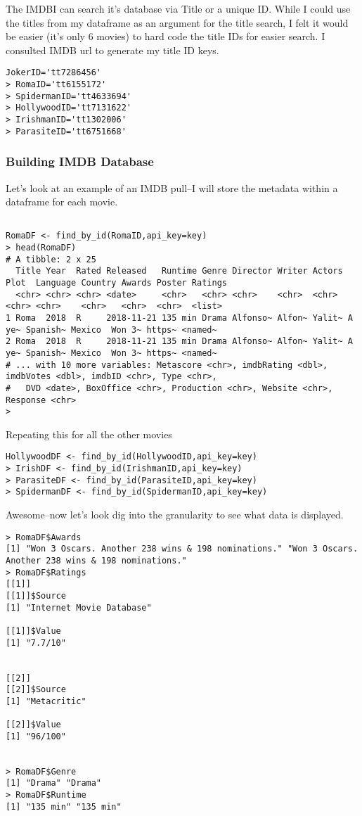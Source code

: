 \documentclass[
]{article}
\begin{document}
The IMDBI can search it's database via Title or a unique ID. While I
could use the titles from my dataframe as an argument for the title
search, I felt it would be easier (it's only 6 movies) to hard code the
title IDs for easier search. I consulted IMDB url to generate my title
ID keys.

\begin{verbatim}
JokerID='tt7286456'
> RomaID='tt6155172'
> SpidermanID='tt4633694'
> HollywoodID='tt7131622'
> IrishmanID='tt1302006'
> ParasiteID='tt6751668'
\end{verbatim}

\hypertarget{building-imdb-database}{%
\subsubsection{Building IMDB Database}\label{building-imdb-database}}

Let's look at an example of an IMDB pull--I will store the metadata
within a dataframe for each movie.

\begin{verbatim}

RomaDF <- find_by_id(RomaID,api_key=key)
> head(RomaDF)
# A tibble: 2 x 25
  Title Year  Rated Released   Runtime Genre Director Writer Actors Plot  Language Country Awards Poster Ratings
  <chr> <chr> <chr> <date>     <chr>   <chr> <chr>    <chr>  <chr>  <chr> <chr>    <chr>   <chr>  <chr>  <list> 
1 Roma  2018  R     2018-11-21 135 min Drama Alfonso~ Alfon~ Yalit~ A ye~ Spanish~ Mexico  Won 3~ https~ <named~
2 Roma  2018  R     2018-11-21 135 min Drama Alfonso~ Alfon~ Yalit~ A ye~ Spanish~ Mexico  Won 3~ https~ <named~
# ... with 10 more variables: Metascore <chr>, imdbRating <dbl>, imdbVotes <dbl>, imdbID <chr>, Type <chr>,
#   DVD <date>, BoxOffice <chr>, Production <chr>, Website <chr>, Response <chr>
> 
\end{verbatim}

Repeating this for all the other movies

\begin{verbatim}
HollywoodDF <- find_by_id(HollywoodID,api_key=key)
> IrishDF <- find_by_id(IrishmanID,api_key=key)
> ParasiteDF <- find_by_id(ParasiteID,api_key=key)
> SpidermanDF <- find_by_id(SpidermanID,api_key=key)
\end{verbatim}

Awesome--now let's look dig into the granularity to see what data is
displayed.

\begin{verbatim}
> RomaDF$Awards
[1] "Won 3 Oscars. Another 238 wins & 198 nominations." "Won 3 Oscars. Another 238 wins & 198 nominations."
> RomaDF$Ratings
[[1]]
[[1]]$Source
[1] "Internet Movie Database"

[[1]]$Value
[1] "7.7/10"


[[2]]
[[2]]$Source
[1] "Metacritic"

[[2]]$Value
[1] "96/100"


> RomaDF$Genre
[1] "Drama" "Drama"
> RomaDF$Runtime
[1] "135 min" "135 min"
\end{verbatim}
\end{document}
